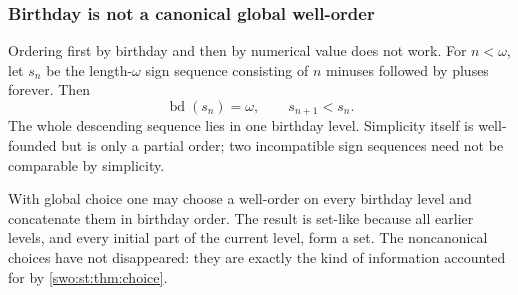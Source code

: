 \documentclass[11pt]{article}
\theoremstyle{definition}
\theoremstyle{remark}
\newcommand{\bd}{\operatorname{bd}}
\begin{document}
\subsubsection{Birthday is not a canonical global well-order}

Ordering first by birthday and then by numerical value does not work.
For $n<\omega$, let $s_n$ be the length-$\omega$ sign sequence consisting
of $n$ minuses followed by pluses forever. Then
\[
 \bd(s_n)=\omega,\qquad s_{n+1}<s_n.
\]
The whole descending sequence lies in one birthday level. Simplicity
itself is well-founded but is only a partial order; two incompatible sign
sequences need not be comparable by simplicity.

With global choice one may choose a well-order on every birthday level
and concatenate them in birthday order. The result is set-like because
all earlier levels, and every initial part of the current level, form a
set. The noncanonical choices have not disappeared: they are exactly the
kind of information accounted for by \cref{swo:st:thm:choice}.

\end{document}
